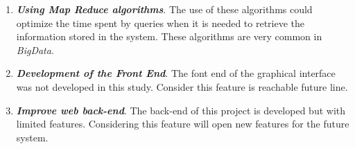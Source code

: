 \begin{enumerate}
\item \textbf{\textit{Using Map Reduce algorithms}}. The use of these algorithms could optimize the time spent by queries when it is needed to retrieve the information stored in the system. These algorithms are very common in \textit{BigData}.

\item \textbf{\textit{Development of the Front End}}. The font end of the graphical interface was not developed in this study. Consider this feature is reachable future line.

\item \textbf{\textit{Improve web back-end}}. The back-end of this project is developed but with limited features. Considering this feature will open new features for the future system.

\end{enumerate}



\newpage
\newpage